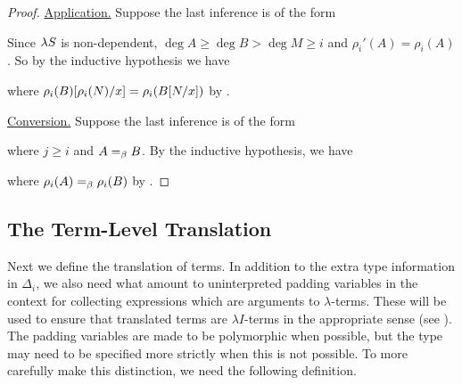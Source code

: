 \documentclass{article}
\begin{document}
\begin{proof}
\noindent\underline{Application.}
Suppose the last inference is of the form
\begin{prooftree}
\end{prooftree}
Since $\lS$ is non-dependent, $\deg A \geq \deg B > \deg M \geq i$ and $\rho_i'(A) = \rho_i(A)$.
So by the inductive hypothesis we have
\begin{prooftree}
\end{prooftree}
where $\sub {\rho_i(B)} {\rho_i(N)} x = \rho_i(\sub B N x)$ by .

\noindent\underline{Conversion.}
Suppose the last inference is of the form
\begin{prooftree}
\end{prooftree}
where $j \geq i$ and $A \eqbeta B$.
By the inductive hypothesis, we have
\begin{prooftree}
\end{prooftree}
where $\rho_i(A) \eqbeta \rho_i(B)$ by .
\end{proof}

\subsection{The Term-Level Translation}

Next we define the translation of terms.
In addition to the extra type information in $\Delta_i$, we also need what amount to uninterpreted padding variables in the context for collecting expressions which are arguments to $\lambda$-terms.
These will be used to ensure that translated terms are $\lambda I$-terms in the appropriate sense (see ).
The padding variables are made to be polymorphic when possible, but the type may need to be specified more strictly when this is not possible.
To more carefully make this distinction, we need the following definition.
\end{document}
